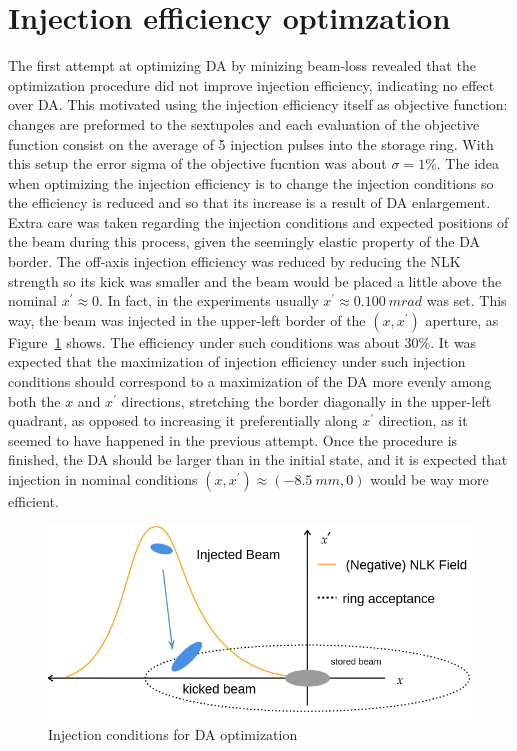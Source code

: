 \section{Injection efficiency optimzation}
The first attempt at optimizing DA by minizing beam-loss revealed that the optimization procedure did not improve injection efficiency, indicating no effect over DA. This motivated using the injection efficiency itself as objective function: changes are preformed to the sextupoles and each evaluation of the objective function consist on the average of 5 injection pulses into the storage ring. With this setup the error sigma of the objective fucntion was about $\sigma=1\%$.
The idea when optimizing the injection efficiency is to change the injection conditions so the efficiency is reduced and so that its increase is a result of DA enlargement. Extra care was taken regarding the injection conditions and expected positions of the beam during this process, given the seemingly elastic property of the DA border. The off-axis injection efficiency was reduced by reducing the NLK strength so its kick was smaller and the beam would be placed a little above the nominal $x^\prime\approx 0$. In fact, in the experiments usually $x^\prime\approx 0.100~\unit{mrad}$ was set. This way, the beam was injected in the upper-left border of the  $(x,x^\prime)$ aperture, as Figure~\ref{fig:inj_cond} shows. The efficiency under such conditions was about 30\%. It was expected that the maximization of injection efficiency under such injection conditions should correspond to a maximization of the DA more evenly among both the $x$ and $x^{\prime}$ directions, stretching the border diagonally in the upper-left quadrant, as opposed to increasing it preferentially along $x^\prime$ direction, as it seemed to have happened in the previous attempt. Once the procedure is finished, the DA should be larger than in the initial state, and it is expected that injection in nominal conditions $(x, x^\prime)\approx(-8.5~\unit{mm}, 0)$ would be way more efficient.
\begin{figure}[b]
    \centering
    \includegraphics[width=0.7\columnwidth]{Images/inj_cond.png}
    \caption{Injection conditions for DA optimization}
    \label{fig:inj_cond}
\end{figure}

